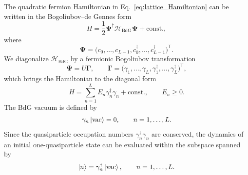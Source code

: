 \documentclass[reprint,amsmath,amssymb,aps,prb,floatfix,showkeys,superscriptaddress]{revtex4-2}
\begin{document}
The quadratic fermion Hamiltonian in
Eq.~\eqref{eq:lattice_Hamiltonian} can be written in the
Bogoliubov--de Gennes form
\begin{equation}
  H
  =
  \frac{1}{2}
  \boldsymbol{\Psi}^{\dagger}
  \mathcal{H}_{\mathrm{BdG}}
  \boldsymbol{\Psi}
  +\text{const.},
  \label{eq:real_space_BdG}
\end{equation}
where
\begin{equation}
  \boldsymbol{\Psi}
  =
  \bigl(
    c_0,\ldots,c_{L-1},
    c_0^\dagger,\ldots,c_{L-1}^\dagger
  \bigr)^{\mathsf T}.
  \label{eq:real_space_Nambu}
\end{equation}
We diagonalize $\mathcal{H}_{\mathrm{BdG}}$ by a fermionic
Bogoliubov transformation
\begin{equation}
  \boldsymbol{\Psi}
  =
  U\boldsymbol{\Gamma},
  \qquad
  \boldsymbol{\Gamma}
  =
  \bigl(
    \gamma_1,\ldots,\gamma_L,
    \gamma_1^\dagger,\ldots,\gamma_L^\dagger
  \bigr)^{\mathsf T},
  \label{eq:Bogoliubov_transformation}
\end{equation}
which brings the Hamiltonian to the diagonal form
\begin{equation}
  H
  =
  \sum_{n=1}^{L}
  E_n\gamma_n^\dagger\gamma_n
   +\text{const.},
  \qquad
  E_n\geq0.
  \label{eq:diagonal_Hamiltonian}
\end{equation}
The BdG vacuum is defined by
\begin{equation}
  \gamma_n\ket{\mathrm{vac}}=0,
  \qquad
  n=1,\ldots,L.
  \label{eq:BdG_vacuum}
\end{equation}
Since the quasiparticle occupation numbers
$\gamma_n^\dagger\gamma_n$ are conserved, the dynamics of an
initial one-quasiparticle state can be evaluated within the subspace
spanned by
\begin{equation}
  \ket{n}
  =
  \gamma_n^\dagger\ket{\mathrm{vac}},
  \qquad
  n=1,\ldots,L.
  \label{eq:one_quasiparticle_basis}
\end{equation}
\end{document}
